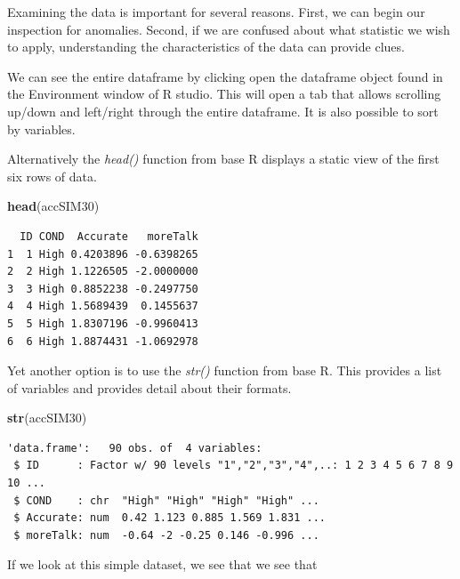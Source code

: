 \documentclass[
  11pt,
]{book}
\newenvironment{Shaded}{\begin{snugshade}}{\end{snugshade}}
\newcommand{\FunctionTok}[1]{\textcolor[rgb]{0.27,0.27,0.27}{\textbf{#1}}}
\newcommand{\NormalTok}[1]{#1}
\begin{document}
Examining the data is important for several reasons. First, we can begin our inspection for anomalies. Second, if we are confused about what statistic we wish to apply, understanding the characteristics of the data can provide clues.

We can see the entire dataframe by clicking open the dataframe object found in the Environment window of R studio. This will open a tab that allows scrolling up/down and left/right through the entire dataframe. It is also possible to sort by variables.

Alternatively the \emph{head()} function from base R displays a static view of the first six rows of data.

\begin{Shaded}
\begin{Highlighting}[]
\FunctionTok{head}\NormalTok{(accSIM30)}
\end{Highlighting}
\end{Shaded}

\begin{verbatim}
  ID COND  Accurate   moreTalk
1  1 High 0.4203896 -0.6398265
2  2 High 1.1226505 -2.0000000
3  3 High 0.8852238 -0.2497750
4  4 High 1.5689439  0.1455637
5  5 High 1.8307196 -0.9960413
6  6 High 1.8874431 -1.0692978
\end{verbatim}

Yet another option is to use the \emph{str()} function from base R. This provides a list of variables and provides detail about their formats.

\begin{Shaded}
\begin{Highlighting}[]
\FunctionTok{str}\NormalTok{(accSIM30)}
\end{Highlighting}
\end{Shaded}

\begin{verbatim}
'data.frame':   90 obs. of  4 variables:
 $ ID      : Factor w/ 90 levels "1","2","3","4",..: 1 2 3 4 5 6 7 8 9 10 ...
 $ COND    : chr  "High" "High" "High" "High" ...
 $ Accurate: num  0.42 1.123 0.885 1.569 1.831 ...
 $ moreTalk: num  -0.64 -2 -0.25 0.146 -0.996 ...
\end{verbatim}

If we look at this simple dataset, we see that we see that
\end{document}
